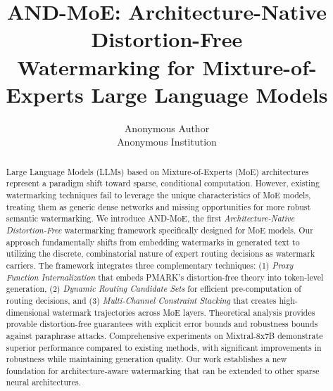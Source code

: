 \documentclass[letterpaper,twocolumn,10pt]{article}
\begin{document}

\date{}

\title{\Large \bf AND-MoE: Architecture-Native Distortion-Free\\ 
  Watermarking for Mixture-of-Experts Large Language Models}

\author{
{\rm Anonymous Author}\\
Anonymous Institution
}

\maketitle

\begin{abstract}
Large Language Models (LLMs) based on Mixture-of-Experts (MoE) architectures represent a paradigm shift toward sparse, conditional computation. However, existing watermarking techniques fail to leverage the unique characteristics of MoE models, treating them as generic dense networks and missing opportunities for more robust semantic watermarking. We introduce AND-MoE, the first \textit{Architecture-Native Distortion-Free} watermarking framework specifically designed for MoE models. Our approach fundamentally shifts from embedding watermarks in generated text to utilizing the discrete, combinatorial nature of expert routing decisions as watermark carriers. The framework integrates three complementary techniques: (1) \textit{Proxy Function Internalization} that embeds PMARK's distortion-free theory into token-level generation, (2) \textit{Dynamic Routing Candidate Sets} for efficient pre-computation of routing decisions, and (3) \textit{Multi-Channel Constraint Stacking} that creates high-dimensional watermark trajectories across MoE layers. Theoretical analysis provides provable distortion-free guarantees with explicit error bounds and robustness bounds against paraphrase attacks. Comprehensive experiments on Mixtral-8x7B demonstrate superior performance compared to existing methods, with significant improvements in robustness while maintaining generation quality. Our work establishes a new foundation for architecture-aware watermarking that can be extended to other sparse neural architectures.
\end{abstract}
\end{document}
